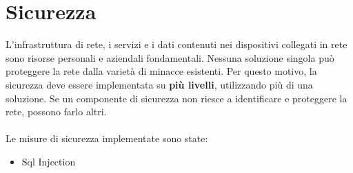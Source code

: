 
\section{Sicurezza}
L'infrastruttura di rete, i servizi e i dati contenuti nei dispositivi collegati in rete sono risorse personali e aziendali fondamentali. Nessuna soluzione singola può proteggere la rete dalla varietà di minacce esistenti. Per questo motivo, la sicurezza deve essere implementata su \textbf{più livelli}, utilizzando più di una soluzione. Se un componente di sicurezza non riesce a identificare e proteggere la rete, possono farlo altri.\\\\Le misure di sicurezza implementate sono state:
\begin{itemize}
    \item Sql Injection
\end{itemize}

